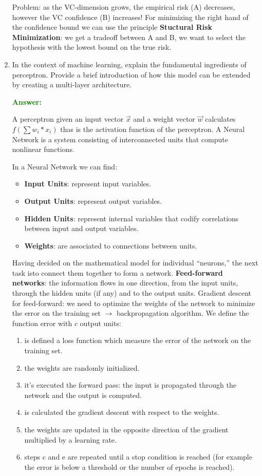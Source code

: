 \documentclass[12pt]{article}
\begin{document}
\begin{enumerate}[label=\textbf{ML.\arabic*}]
    Problem: as the VC-dimension grows, the empirical risk (A) decreases, however the VC confidence (B) increases!
    For minimizing the right hand of the confidence bound we can use the principle \textbf{Stuctural Risk Minimization}:
    we get a tradeoff between A and B, we want to select the hypothesis with the lowest bound on the true risk.



    \item In the context of machine learning, explain the fundamental ingredients of perceptron.
    Provide a brief introduction of how this model can be extended by creating a multi-layer architecture.

    \textcolor{green}{\textbf{Answer:}}

    A perceptron given an input vector $\vec{x}$ and a weight vector $\vec{w}$ calculates $f(\sum{w_i*x_i})$ thas is the activation function of the perceptron.
    A Neural Network is a system consisting of interconnected units that compute nonlinear functions.

    In a Neural Network we can find:
    \begin{itemize}
        \item \textbf{Input Units}: represent input variables.
        \item \textbf{Output Units}: represent output variables.
        \item \textbf{Hidden Units}: represent internal variables that codify correlations between input and output variables.
        \item \textbf{Weights}: are associated to connections between units.
    \end{itemize}

    Having decided on the mathematical model for individual “neurons,”  the next task isto connect them together to form a network.
    \textbf{Feed-forward networks}: the information flows in one direction, from the input units, through the hidden units (if any) and to the output units.
    Gradient descent for feed-forward: we need to optimize the weights of the network to minimize the error on the training set $\rightarrow$ backpropagation algorithm.
    We define the function error with $c$ output units:
    \begin{enumerate}
        \item is defined a loss function which measure the error of the network on the training set.
        \item the weights are randomly initialized.
        \item it's executed the forward pass: the input is propagated through the network and the output is computed.
        \item is calculated the gradient descent with respect to the weights.
        \item the weights are updated in the opposite direction of the gradient multiplied by a learning rate.
        \item steps c and e are repeated until a stop condition is reached (for example the error is below a threshold or the number of epochs is reached).
    \end{enumerate}



\end{enumerate}
\end{document}
